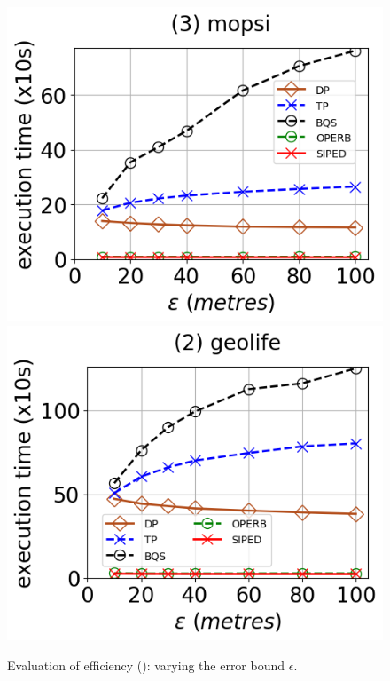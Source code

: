 \begin{figure}[tb!]
	\includegraphics[scale=0.315]{Figures/Exp-PED-time-epsilon-mopsi.png}	\hspace{1ex}
	\includegraphics[scale=0.315]{Figures/Exp-PED-time-epsilon-geolife.png}	\hspace{1ex}
	\vspace{-2.5ex}
	\caption{\small Evaluation of efficiency (\ped): varying the error bound $\epsilon$.}\label{fig:time-epsilon-ped}
	\vspace{-2ex}
\end{figure}

